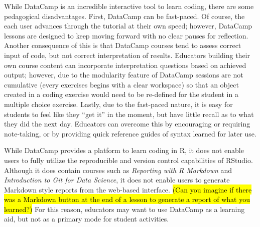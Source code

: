 \documentclass{tise_style_doi}
\begin{document}
While DataCamp is an incredible interactive tool to learn coding, there are some
pedagogical disadvantages. First, DataCamp can be fast-paced. Of course, the 
each user advances through the tutorial at their own speed; however, DataCamp
lessons are designed to keep moving forward with no clear pauses for reflection.
Another consequence of this is that DataCamp courses tend to assess correct
input of code, but not correct interpretation of results. Educators building
their own course content can incorporate interpretation questions based on 
achieved output; however, due to the modularity feature of DataCamp sessions
are not cumulative (every exercises begins with a clear workspace) so that 
an object created in a coding exercise would need to be re-defined for the student
in a multiple choice exercise. Lastly, due to the fast-paced nature, it is easy
for students to feel like they ``get it'' in the moment, but have little
recall as to what they did the next day. Educators can overcome this by 
encouraging or requiring note-taking, or by providing quick reference guides
of syntax learned for later use.

While DataCamp provides a platform to learn coding in R, it does not enable
users to fully utilize the reproducible and version control capabilities
of RStudio. Although it does contain courses such as 
\emph{Reporting with R Markdown} and \emph{Introduction to Git for Data Science},
it does not enable users to generate Markdown style reports from the web-based
interface. \hl{(Can you imagine if there was a Markdown button at the end of a lesson
to generate a report of what you learned?)} For this reason, educators may
want to use DataCamp as a learning aid, but not as a primary mode for 
student activities.
\end{document}
